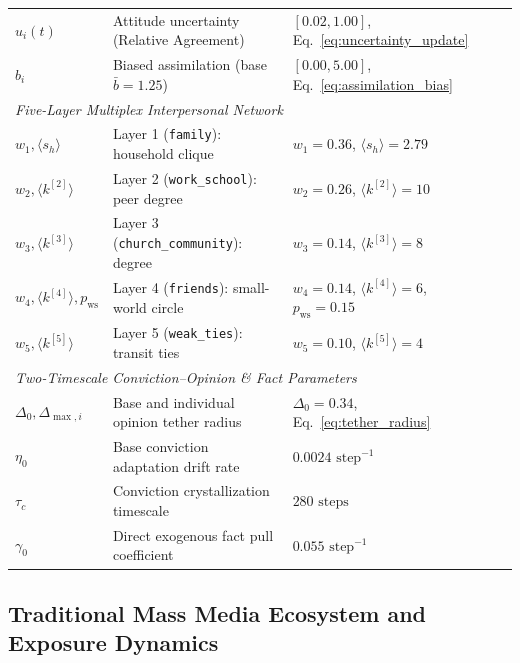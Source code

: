 \documentclass{article}
\begin{document}
\begin{table}[htbp]
\begin{tabular}{lp{5.1cm}p{3.6cm}p{3.8cm}}
$u_i(t)$ & Attitude uncertainty (Relative Agreement) & $[0.02, 1.00]$, Eq.~\eqref{eq:uncertainty_update} & \citet{deffuant2002how} \\
$b_i$ & Biased assimilation (base $\bar{b}=1.25$) & $[0.00, 5.00]$, Eq.~\eqref{eq:assimilation_bias} & \citet{lord1979biased, dandekar2013biased} \\
\midrule
\multicolumn{4}{l}{\textit{Five-Layer Multiplex Interpersonal Network}} \\
$w_1, \langle s_h \rangle$ & Layer 1 (\texttt{family}): household clique & $w_1 = 0.36$, $\langle s_h \rangle = 2.79$ & \citet{ibge2022censo} \\
$w_2, \langle k^{[2]} \rangle$ & Layer 2 (\texttt{work\_school}): peer degree & $w_2 = 0.26$, $\langle k^{[2]} \rangle = 10$ & \citet{inep2023censo, mte2023rais} \\
$w_3, \langle k^{[3]} \rangle$ & Layer 3 (\texttt{church\_community}): degree & $w_3 = 0.14$, $\langle k^{[3]} \rangle = 8$ & \citet{mcpherson2001birds} \\
$w_4, \langle k^{[4]} \rangle, p_{\mathrm{ws}}$ & Layer 4 (\texttt{friends}): small-world circle & $w_4 = 0.14$, $\langle k^{[4]} \rangle = 6$, $p_{\mathrm{ws}}=0.15$ & \citet{watts1998collective} \\
$w_5, \langle k^{[5]} \rangle$ & Layer 5 (\texttt{weak\_ties}): transit ties & $w_5 = 0.10$, $\langle k^{[5]} \rangle = 4$ & \citet{granovetter1973strength, ibge2022censo} \\
\midrule
\multicolumn{4}{l}{\textit{Two-Timescale Conviction--Opinion \& Fact Parameters}} \\
$\Delta_0, \Delta_{\max, i}$ & Base and individual opinion tether radius & $\Delta_0 = 0.34$, Eq.~\eqref{eq:tether_radius} & \citet{sherif1961social, howe2017attitude} \\
$\eta_0$ & Base conviction adaptation drift rate & $0.0024 \text{ step}^{-1}$ & \citet{kiley2020measuring} \\
$\tau_c$ & Conviction crystallization timescale & $280 \text{ steps}$ & \citet{alwin1991aging} \\
$\gamma_0$ & Direct exogenous fact pull coefficient & $0.055 \text{ step}^{-1}$ & \citet{mullainathan2005market, zaller1992nature} \\
\bottomrule
\end{tabular}
\end{table}

\subsection{Traditional Mass Media Ecosystem and Exposure Dynamics}
\label{subsec:methods_traditional_media}
\end{document}
